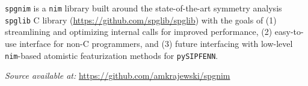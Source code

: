 \texttt{spgnim} is a \texttt{nim} library built around the state-of-the-art symmetry analysis \texttt{spglib} C library (\href{https://github.com/spglib/spglib}{https://github.com/spglib/spglib}) with the goals of (1) streamlining and optimizing internal calls for improved performance, (2) easy-to-use interface for non-C programmers, and (3) future interfacing with low-level \texttt{nim}-based atomistic featurization methods for \texttt{pySIPFENN}.

\hspace{24pt} 
\textit{Source available at:} 
\href{https://github.com/amkrajewski/spgnim}{https://github.com/amkrajewski/spgnim}


 
